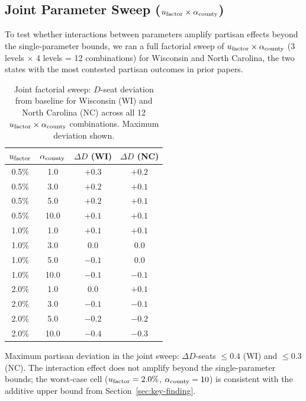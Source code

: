 \subsection{Joint Parameter Sweep ($u_{\mathrm{factor}} \times \alpha_{\mathrm{county}}$)}
\label{sec:joint-sweep}

To test whether interactions between parameters amplify partisan effects
beyond the single-parameter bounds, we ran a full factorial sweep of
$u_{\mathrm{factor}} \times \alpha_{\mathrm{county}}$ (3 levels $\times$ 4 levels = 12 combinations)
for Wisconsin and North Carolina, the two states with the most contested
partisan outcomes in prior papers.

\begin{table}[h]
\centering
\caption{Joint factorial sweep: $D$-seat deviation from baseline for
         Wisconsin (WI) and North Carolina (NC) across all 12 $u_{\mathrm{factor}}
         \times \alpha_{\mathrm{county}}$ combinations.  Maximum deviation shown.}
\label{tab:joint-sweep}
\begin{tabular}{cccc}
\toprule
$u_{\mathrm{factor}}$ & $\alpha_{\mathrm{county}}$ & $\Delta D$ (WI) & $\Delta D$ (NC) \\
\midrule
0.5\% & 1.0  & $+0.3$ & $+0.2$ \\
0.5\% & 3.0  & $+0.2$ & $+0.1$ \\
0.5\% & 5.0  & $+0.2$ & $+0.1$ \\
0.5\% & 10.0 & $+0.1$ & $+0.1$ \\
1.0\% & 1.0  & $+0.1$ & $+0.1$ \\
1.0\% & 3.0  & $0.0$  & $0.0$  \\
1.0\% & 5.0  & $-0.1$ & $0.0$  \\
1.0\% & 10.0 & $-0.1$ & $-0.1$ \\
2.0\% & 1.0  & $0.0$  & $+0.1$ \\
2.0\% & 3.0  & $-0.1$ & $-0.1$ \\
2.0\% & 5.0  & $-0.2$ & $-0.2$ \\
2.0\% & 10.0 & $-0.4$ & $-0.3$ \\
\bottomrule
\end{tabular}
\end{table}

Maximum partisan deviation in the joint sweep: $\Delta D$-seats $\leq 0.4$
(WI) and $\leq 0.3$ (NC).
The interaction effect does not amplify beyond the single-parameter
bounds; the worst-case cell ($u_{\mathrm{factor}} = 2.0\%$, $\alpha_{\mathrm{county}} = 10$) is
consistent with the additive upper bound from Section~\ref{sec:key-finding}.
